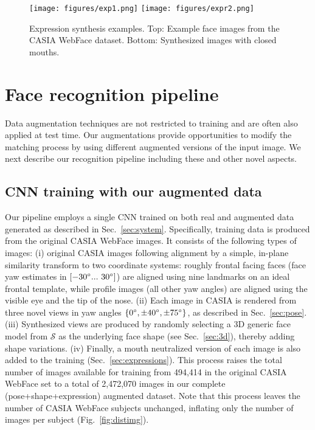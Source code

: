 \documentclass[runningheads]{llncs}
\newcommand{\minisection}[1]{\vspace{0.04in} \noindent {\bf #1:} }
\begin{document}
\begin{figure}[t]
\centering
\texttt{[image: figures/exp1.png]}
\texttt{[image: figures/expr2.png]}
\caption{Expression synthesis examples. Top: Example face images from the CASIA WebFace dataset. Bottom: Synthesized images with closed mouths.}
\label{fig:expr}
\end{figure}



\section{Face recognition pipeline}\label{sec:cnn}
Data augmentation techniques are not restricted to training and are often also applied at test time. Our augmentations provide opportunities to modify the matching process by using different augmented versions of the input image. We next describe our recognition pipeline including these and other novel aspects. 

\subsection{CNN training with our augmented data}\label{sec:training}

\minisection{Augmented training data}
Our pipeline employs a single CNN trained on both real and augmented data generated as described in Sec.~\ref{sec:system}. Specifically, training data is produced from the original CASIA WebFace images. It consists of the following types of images: (i) original CASIA images following alignment by a simple, in-plane similarity transform to two coordinate systems: roughly frontal facing faces (face yaw estimates in $[ -30\degree...~30\degree ]$) are aligned using nine landmarks on an ideal frontal template, while profile images (all other yaw angles) are aligned using the visible eye and the tip of the nose. (ii) Each image in CASIA is rendered from three novel views in yaw angles $\{0\degree,\pm40\degree,\pm75\degree\}$, as described in Sec.~\ref{sec:pose}. (iii) Synthesized views are produced by randomly selecting a 3D generic face model from $\mathcal{S}$ as the underlying face shape (see Sec.~\ref{sec:3d}), thereby adding shape variations. (iv) Finally, a mouth neutralized version of each image is also added to the training (Sec.~\ref{sec:expressions}). This process raises the total number of images available for training from 494,414 in the original CASIA WebFace set to a total of 2,472,070 images in our complete (pose+shape+expression) augmented dataset. Note that this process leaves the number of CASIA WebFace subjects unchanged, inflating only the number of images per subject (Fig.~\ref{fig:distimg}). 
\end{document}
